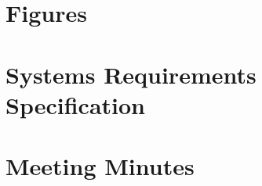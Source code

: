 \documentclass[12pt]{report}
\begin{document}
\begin{appendices}
\chapter{Figures}


\chapter{Systems Requirements Specification}


\chapter{Meeting Minutes}

\end{appendices}

%


\end{document}
